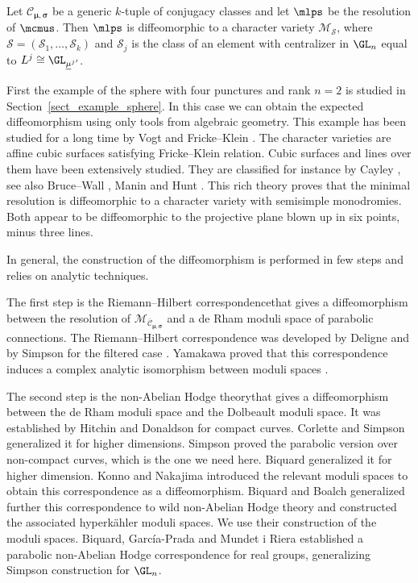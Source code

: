 \begin{theorem}\label{th_diffeo_resol_ss}
Let $\mathcal{C}_{\boldsymbol{\mu},\boldsymbol{\sigma}}$ be a generic $k$-tuple of conjugacy classes and let $\mlps$ be the resolution of $\mcmus$. Then $\mlps$ is diffeomorphic to a character variety $\mathcal{M}_{\boldsymbol{\mathcal{S}}}$, where $\boldsymbol{\mathcal{S}}=\left(\mathcal{S}_1,\dots,\mathcal{S}_k\right)$ and $\mathcal{S}_j$ is the class of an element with centralizer in $\GL_n$ equal to $L^j\cong \GL_{{\underline{\mu}^j}'}$.
\end{theorem}

First the example of the sphere with four punctures and rank $n=2$ is studied in Section~\ref{sect_example_sphere}. In this case we can obtain the expected diffeomorphism using only tools from algebraic geometry. This example has been studied for a long time by Vogt \cite{Vogt} and Fricke--Klein \cite{Fricke_Klein}. The character varieties are affine cubic surfaces satisfying Fricke--Klein relation. Cubic surfaces and lines over them have been extensively studied. They are classified for instance by Cayley \cite{Cayley}, see also Bruce--Wall \cite{Bruce_cubic}, Manin \cite{Manin1986} and Hunt \cite{Hunt}. This rich theory proves that the minimal resolution is diffeomorphic to a character variety with semisimple monodromies. Both appear to be diffeomorphic to the projective plane blown up in six points, minus three lines.

In general, the construction of the diffeomorphism is performed in few steps and relies on analytic techniques.

The first step is the Riemann--Hilbert correspondencethat gives a diffeomorphism between the resolution of $\mathcal{M}_{\overline{{\mathcal{C}}}_{\boldsymbol{\mu},\boldsymbol{\sigma}}}$ and a de Rham moduli space of parabolic connections. The Riemann--Hilbert correspondence was developed by Deligne \cite{Deligne_equadif_rh} and by Simpson for the filtered case \cite{Simpson}. Yamakawa proved that this correspondence induces a complex analytic isomorphism between moduli spaces \cite{Yamakawa}.

The second step is the non-Abelian Hodge theorythat gives a diffeomorphism between the de Rham moduli space and the Dolbeault moduli space. It was established by Hitchin \cite{Hitchin87} and Donaldson \cite{Donaldson} for compact curves. Corlette \cite{Corlette} and Simpson \cite{Simpson_88} generalized it for higher dimensions. Simpson \cite{Simpson} proved the parabolic version over non-compact curves, which is the one we need here. Biquard \cite{Biquard97} generalized it for higher dimension. Konno \cite{Konno} and Nakajima \cite{Nakajima_1996} introduced the relevant moduli spaces to obtain this correspondence as a diffeomorphism. Biquard and Boalch \cite{Biquard_Boalch_2004} generalized further this correspondence to wild non-Abelian Hodge theory and constructed the associated hyperkähler moduli spaces. We use their construction of the moduli spaces. Biquard, García-Prada and Mundet i Riera \cite{Biquard_Garcia_Prada_Riera} established a parabolic non-Abelian Hodge correspondence for real groups, generalizing Simpson construction for $\GL_n$.

